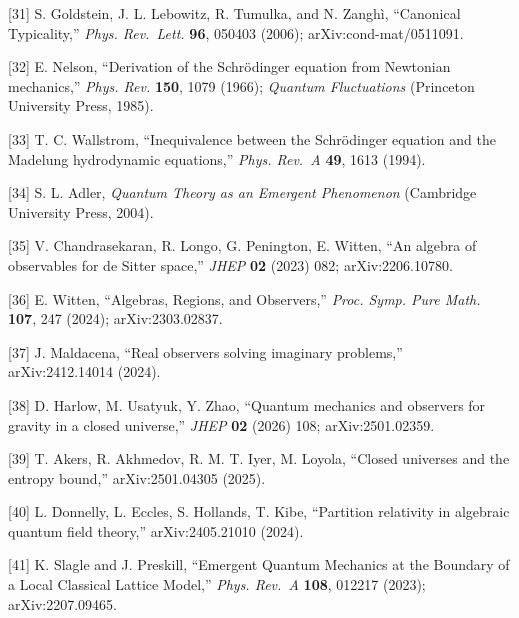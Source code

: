 \documentclass[
]{article}
\begin{document}
{[}31{]} S. Goldstein, J. L. Lebowitz, R. Tumulka, and N. Zanghì,
``Canonical Typicality,'' \emph{Phys. Rev.~Lett.} \textbf{96}, 050403
(2006); arXiv:cond-mat/0511091.

{[}32{]} E. Nelson, ``Derivation of the Schrödinger equation from
Newtonian mechanics,'' \emph{Phys. Rev.} \textbf{150}, 1079 (1966);
\emph{Quantum Fluctuations} (Princeton University Press, 1985).

{[}33{]} T. C. Wallstrom, ``Inequivalence between the Schrödinger
equation and the Madelung hydrodynamic equations,'' \emph{Phys. Rev.~A}
\textbf{49}, 1613 (1994).

{[}34{]} S. L. Adler, \emph{Quantum Theory as an Emergent Phenomenon}
(Cambridge University Press, 2004).

{[}35{]} V. Chandrasekaran, R. Longo, G. Penington, E. Witten, ``An
algebra of observables for de Sitter space,'' \emph{JHEP} \textbf{02}
(2023) 082; arXiv:2206.10780.

{[}36{]} E. Witten, ``Algebras, Regions, and Observers,'' \emph{Proc.
Symp. Pure Math.} \textbf{107}, 247 (2024); arXiv:2303.02837.

{[}37{]} J. Maldacena, ``Real observers solving imaginary problems,''
arXiv:2412.14014 (2024).

{[}38{]} D. Harlow, M. Usatyuk, Y. Zhao, ``Quantum mechanics and
observers for gravity in a closed universe,'' \emph{JHEP} \textbf{02}
(2026) 108; arXiv:2501.02359.

{[}39{]} T. Akers, R. Akhmedov, R. M. T. Iyer, M. Loyola, ``Closed
universes and the entropy bound,'' arXiv:2501.04305 (2025).

{[}40{]} L. Donnelly, L. Eccles, S. Hollands, T. Kibe, ``Partition
relativity in algebraic quantum field theory,'' arXiv:2405.21010 (2024).

{[}41{]} K. Slagle and J. Preskill, ``Emergent Quantum Mechanics at the
Boundary of a Local Classical Lattice Model,'' \emph{Phys. Rev.~A}
\textbf{108}, 012217 (2023); arXiv:2207.09465.
\end{document}
